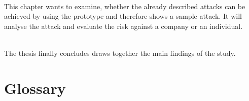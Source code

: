 \vspace{0.5em}\\
\noindent This chapter wants to examine, whether the already described attacks
can be achieved by using the prototype and therefore shows a sample attack. It
will analyse the attack and evaluate the risk against a company or an
individual.

\vspace{0.5em}\\
\noindent The thesis finally concludes draws together the main findings of the
study.

\newpage
\section{Glossary}
